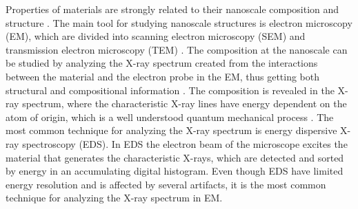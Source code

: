 Properties of materials are strongly related to their nanoscale composition and structure \cite{callister2014materials}.
The main tool for studying nanoscale structures is electron microscopy (EM), which are divided into scanning electron microscopy (SEM) and transmission electron microscopy (TEM) \cite{goldstein_scanning_2018,williams_carter_tem_2009}.
The composition at the nanoscale can be studied by analyzing the X-ray spectrum created from the interactions between the material and the electron probe in the EM, thus getting both structural and compositional information \cite{jenkins_xrayspectroscopy}.
The composition is revealed in the X-ray spectrum, where the characteristic X-ray lines have energy dependent on the atom of origin, which is a well understood quantum mechanical process \cite{hollas_modern_2004,goldstein_scanning_2018}.
The most common technique for analyzing the X-ray spectrum is energy dispersive X-ray spectroscopy (EDS).
In EDS the electron beam of the microscope excites the material that generates the characteristic X-rays, which are detected and sorted by energy in an accumulating digital histogram.
Even though EDS have limited energy resolution and is affected by several artifacts, it is the most common technique for analyzing the X-ray spectrum in EM.

